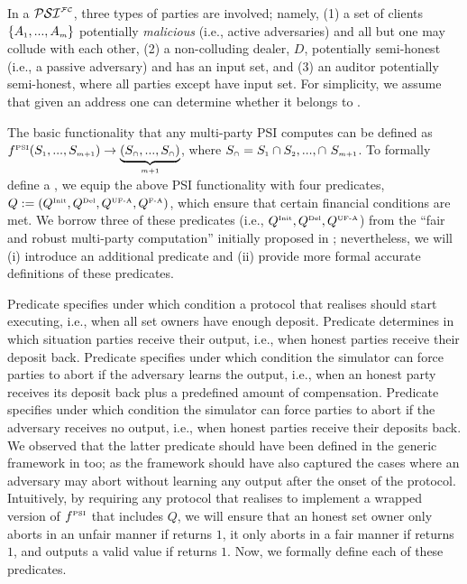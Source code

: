   
In a  $\mathcal{PSI}^{\scriptscriptstyle \mathcal{FC}}$, three types of parties are involved; namely, (1) a set of clients $\{A_{\scriptscriptstyle 1},...,A_{\scriptscriptstyle m}\}$ potentially \emph{malicious} (i.e., active adversaries) and all but one may collude with each other, (2) a non-colluding dealer, $D$, potentially semi-honest (i.e., a passive adversary) and has an input set, and (3) an auditor \aud potentially semi-honest, where all parties except \aud have input set. For simplicity, we assume that given an address one can determine whether it belongs to \aud. 


The basic functionality that any multi-party PSI computes can be defined as $f^{\scriptscriptstyle\text{PSI}} (S_{\scriptscriptstyle 1},..., S_{\scriptscriptstyle m+1})\rightarrow\underbrace{(S_{\scriptscriptstyle\cap},..., S_{\scriptscriptstyle\cap})}_{\scriptscriptstyle m+1}$, where $S_{\scriptscriptstyle\cap}= S_{\scriptscriptstyle 1} \cap S_{\scriptscriptstyle 2}, ...,\cap\  S_{\scriptscriptstyle m+1}$.  To formally define a \p, we equip the above PSI functionality with four predicates,  $Q:=(Q^{\scriptscriptstyle \text{Init}}, Q^{\scriptscriptstyle \text{Del}}, Q^{\scriptscriptstyle \text{UF-A}}, Q^{\scriptscriptstyle \text{F-A}})$, which ensure that certain financial conditions are met. 
   We borrow three of these predicates (i.e., $Q^{\scriptscriptstyle \text{Init}}, Q^{\scriptscriptstyle \text{Del}}, Q^{\scriptscriptstyle \text{UF-A}}$) from the ``fair and robust multi-party computation'' initially proposed in \cite{KiayiasZZ16}; nevertheless, we will (i) introduce an additional predicate  \qFAbt and (ii) provide more formal accurate definitions of these predicates. 
   
Predicate \qinit specifies under which condition a protocol that realises \p should start executing, i.e., when all set owners have enough deposit. Predicate \qdel determines in which situation parties receive their output, i.e., when honest parties receive their deposit back. Predicate \qUnFAbt specifies under which condition the simulator can force parties to abort if the adversary learns the output,  i.e., when an honest party receives its deposit back plus a predefined amount of compensation. Predicate \qFAbt specifies under which condition the simulator can force parties to abort if the adversary receives no output, i.e., when honest parties receive their deposits back. We observed that the latter predicate should have been defined in the generic framework in \cite{KiayiasZZ16} too; as the framework should have also captured the cases where an adversary may abort without learning any output after the onset of the protocol.  Intuitively, by requiring any protocol that realises \p to implement a wrapped version of $f^{\scriptscriptstyle\text{PSI}}$ that includes $Q$, we will ensure that an honest set owner only aborts in an unfair manner if \qUnFAbt returns  $1$, it only aborts in a fair manner if \qFAbt returns  $1$, and outputs a valid value if \qdel returns $1$. Now, we formally define each of these predicates.  
 


